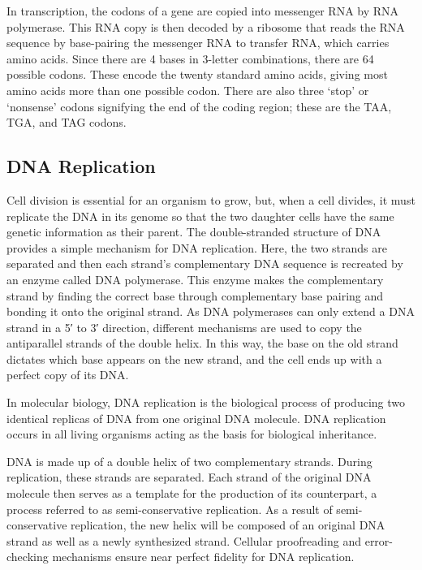 In transcription, the codons of a gene are copied into messenger RNA by RNA polymerase. This RNA copy is then decoded by a ribosome that reads the RNA sequence by base-pairing the messenger RNA to transfer RNA, which carries amino acids. Since there are 4 bases in 3-letter combinations, there are 64 possible codons. These encode the twenty standard amino acids, giving most amino acids more than one possible codon. There are also three `stop' or `nonsense' codons signifying the end of the coding region; these are the TAA, TGA, and TAG codons.

\hypertarget{dna-replication}{%
\subsection{DNA Replication}\label{dna-replication}}

Cell division is essential for an organism to grow, but, when a cell divides, it must replicate the DNA in its genome so that the two daughter cells have the same genetic information as their parent. The double-stranded structure of DNA provides a simple mechanism for DNA replication. Here, the two strands are separated and then each strand's complementary DNA sequence is recreated by an enzyme called DNA polymerase. This enzyme makes the complementary strand by finding the correct base through complementary base pairing and bonding it onto the original strand. As DNA polymerases can only extend a DNA strand in a 5′ to 3′ direction, different mechanisms are used to copy the antiparallel strands of the double helix. In this way, the base on the old strand dictates which base appears on the new strand, and the cell ends up with a perfect copy of its DNA.

In molecular biology, DNA replication is the biological process of producing two identical replicas of DNA from one original DNA molecule. DNA replication occurs in all living organisms acting as the basis for biological inheritance.

DNA is made up of a double helix of two complementary strands. During replication, these strands are separated. Each strand of the original DNA molecule then serves as a template for the production of its counterpart, a process referred to as semi-conservative replication. As a result of semi-conservative replication, the new helix will be composed of an original DNA strand as well as a newly synthesized strand. Cellular proofreading and error-checking mechanisms ensure near perfect fidelity for DNA replication.



